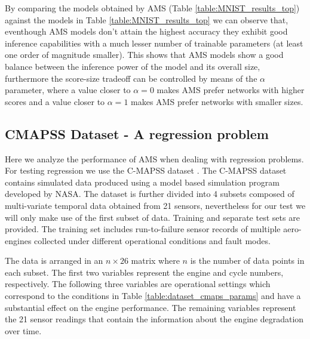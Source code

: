 \documentclass[journal]{IEEEtran}
\begin{document}
By comparing the models obtained by AMS (Table \ref{table:MNIST_results_top}) against the models in Table \ref{table:MNIST_results_top} we can observe that, eventhough AMS models don't attain the highest accuracy they exhibit good inference capabilities with a much lesser number of trainable parameters (at least one order of magnitude smaller). This shows that AMS models show a good balance between the inference power of the model and its overall size, furthermore the score-size tradeoff can be controlled by means of the $\alpha$ parameter, where a value closer to $\alpha=0$ makes AMS prefer networks with higher scores and a value closer to $\alpha = 1$ makes AMS prefer networks with smaller sizes.


\subsection{CMAPSS Dataset - A regression problem}

Here we analyze the performance of AMS when dealing with regression problems. For testing regression we use the C-MAPSS dataset \cite{CMAPS2008}. The C-MAPSS dataset contains simulated data produced using a model based simulation program developed by NASA. The dataset is further divided into 4 subsets composed of multi-variate temporal data obtained from 21 sensors, nevertheless for our test we will only make use of the first subset of data. Training and separate test sets are provided. The training set includes run-to-failure sensor records of multiple aero-engines collected under different operational conditions and fault modes.

The data is arranged in an $n\times26$ matrix where $n$ is the number of data points in each subset. The first two variables represent the engine and cycle
numbers, respectively. The following three variables are operational settings which correspond to the conditions in Table \ref{table:dataset_cmaps_params} and have a
substantial effect on the engine performance. The remaining variables represent the 21 sensor readings that contain the information about the engine
degradation over time.

\begin{table}[!htb]
\begin{center}
\end{center}
\caption{CMAPSS dataset details.}
\label{table:dataset_cmaps_params}
\end{table}
\end{document}
